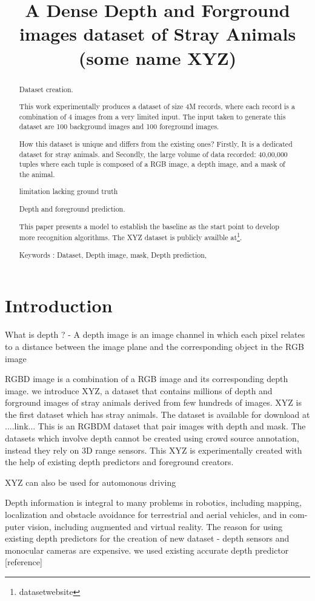 \documentclass{article}
\title{A Dense Depth and Forground images dataset of Stray Animals (some name XYZ)}
\begin{document}
\maketitle

\begin{abstract}
Dataset creation. 

This work experimentally produces a dataset of size 4M records, where each record is a combination of 4 images from a very limited input. The input taken to generate this dataset are 100 background images and 100 foreground images.

How this dataset is unique and differs from the existing ones?  Firstly, It is a dedicated dataset for stray animals. and Secondly, the large
volume of data recorded: 40,00,000 tuples where each tuple is composed of a RGB image, a depth image, and a mask of the animal. 

limitation lacking ground truth

Depth and foreground prediction.

This paper presents a model to establish the baseline as the start point to develop more recognition algorithms. The XYZ dataset is publicly availble at\footnote{datasetwebsite}.

Keywords : Dataset, Depth image, mask, Depth prediction,
\end{abstract}

 

\section{Introduction}
What is depth ? - A depth image is an image channel in which each pixel relates to a distance between the image plane and the corresponding object in the RGB image

RGBD image is a combination of a RGB image and its corresponding depth image. 
we introduce XYZ, a dataset that contains millions of depth and forground images of stray animals derived from few hundreds of images. XYZ is the first dataset which has stray animals. The dataset is available for download at ....link...
This is an RGBDM dataset that pair images with depth and mask. The datasets which involve depth cannot be created using crowd source annotation, instead they rely on 3D range sensors. This XYZ is experimentally created with the help of existing depth predictors and foreground creators.

XYZ can also be used for automonous driving


Depth information is integral to many problems in
robotics, including mapping, localization and obstacle avoidance for terrestrial and aerial vehicles, and in com- puter vision, including augmented and virtual reality\cite{marchand2015pose}.
The reason for using existing depth predictors for the creation of new dataset - depth sensors and monocular cameras are expensive. we used existing accurate depth predictor [reference]
\end{document}
